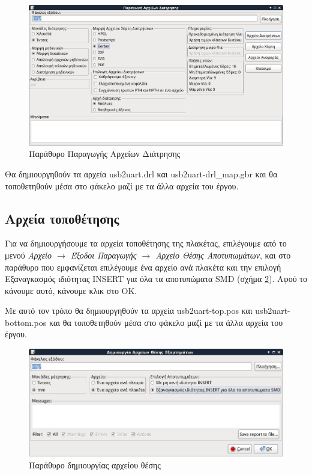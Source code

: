 \documentclass[a4paper]{article}
\begin{document}
\begin{figure}
  \begin{center}
    \includegraphics[width=.9\textwidth]{img/pcb-dial-drill.png}
    \caption{Παράθυρο Παραγωγής Αρχείων Διάτρησης}
    \label{fig:pcb-dial-drill}
  \end{center}
\end{figure}

Θα δημιουργηθούν τα αρχεία usb2uart.drl και usb2uart-drl\_map.gbr και θα τοποθετηθούν μέσα στο φάκελο μαζί με τα άλλα αρχεία του έργου.

\subsection{Αρχεία τοποθέτησης}
Για να δημιουργήσουμε τα αρχεία τοποθέτησης της πλακέτας, επιλέγουμε από το μενού \textit{Αρχείο $\rightarrow$ Έξοδοι Παραγωγής $\rightarrow$ Αρχείο Θέσης Αποτυπωμάτων}, και στο παράθυρο που εμφανίζεται επιλέγουμε ένα αρχείο ανά πλακέτα και την επιλογή Εξαναγκασμός ιδιότητας INSERT για όλα τα αποτυπώματα SMD (σχήμα \ref{fig:pcb-dial-pos}). Αφού το κάνουμε αυτό, κάνουμε κλικ στο OK.

Με αυτό τον τρόπο θα δημιουργηθούν τα αρχεία usb2uart-top.pos και usb2uart-bottom.pos και θα τοποθετηθούν μέσα στο φάκελο μαζί με τα άλλα αρχεία του έργου.

\begin{figure}
  \begin{center}
    \includegraphics[width=.9\textwidth]{img/pcb-dial-pos.png}
    \caption{Παράθυρο δημιουργίας αρχείου θέσης}
    \label{fig:pcb-dial-pos}
  \end{center}
\end{figure}
\end{document}

